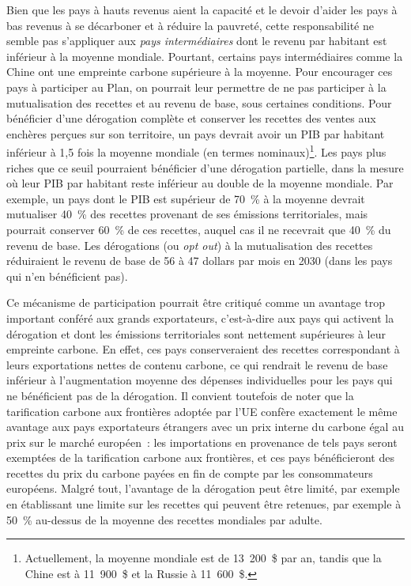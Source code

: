 \documentclass[a5paper,french]{memoir}
\begin{document}
Bien que les pays à hauts revenus aient la capacité et le devoir d'aider les pays à bas revenus à se décarboner et à réduire la pauvreté, cette responsabilité ne semble pas s'appliquer aux \textit{pays intermédiaires} dont le revenu par habitant est inférieur à la moyenne mondiale. Pourtant, certains pays intermédiaires comme la Chine ont une empreinte carbone supérieure à la moyenne. Pour encourager ces pays à participer au Plan, on pourrait leur permettre de ne pas participer à la mutualisation des recettes et au revenu de base, sous certaines conditions. Pour bénéficier d'une dérogation complète et conserver les recettes des ventes aux enchères perçues sur son territoire, un pays devrait avoir un PIB par habitant inférieur à 1,5 fois la moyenne mondiale (en termes nominaux)\footnote{Actuellement, la moyenne mondiale est de 13~200~\$ par an, tandis que la Chine est à 11~900~\$ et la Russie à 11~600~\$.}. Les pays plus riches que ce seuil pourraient bénéficier d'une dérogation partielle, dans la mesure où leur PIB par habitant reste inférieur au double de la moyenne mondiale. Par exemple, un pays dont le PIB est supérieur de 70~\% à la moyenne devrait mutualiser 40~\% des recettes provenant de ses émissions territoriales, mais pourrait conserver 60~\% de ces recettes, auquel cas il ne recevrait que 40~\% du revenu de base. Les dérogations (ou \textit{opt out}) à la mutualisation des recettes réduiraient le revenu de base de 56 à 47 dollars par mois en 2030 (dans les pays qui n'en bénéficient pas). 

Ce mécanisme de participation pourrait être critiqué comme un avantage trop important conféré aux grands exportateurs, c'est-à-dire aux pays qui activent la dérogation et dont les émissions territoriales sont nettement supérieures à leur empreinte carbone. En effet, ces pays conserveraient des recettes correspondant à leurs exportations nettes de contenu carbone, ce qui rendrait le revenu de base inférieur à l'augmentation moyenne des dépenses individuelles pour les pays qui ne bénéficient pas de la dérogation. Il convient toutefois de noter que la tarification carbone aux frontières adoptée par l'UE confère exactement le même avantage aux pays exportateurs étrangers avec un prix interne du carbone égal au prix sur le marché européen~: les importations en provenance de tels pays seront exemptées de la tarification carbone aux frontières, et ces pays bénéficieront des recettes du prix du carbone payées en fin de compte par les consommateurs européens. Malgré tout, l'avantage de la dérogation peut être limité, par exemple en établissant une limite sur les recettes qui peuvent être retenues, par exemple à 50~\% au-dessus de la moyenne des recettes mondiales par adulte. %
\end{document}
